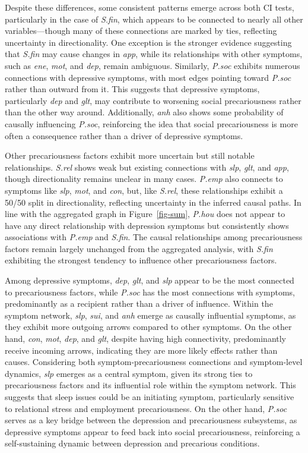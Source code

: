 \documentclass[
]{article}
\begin{document}
Despite these differences, some consistent patterns emerge across both
CI tests, particularly in the case of \emph{S.fin}, which appears to be
connected to nearly all other variables---though many of these
connections are marked by ties, reflecting uncertainty in
directionality. One exception is the stronger evidence suggesting that
\emph{S.fin} may cause changes in \emph{app}, while its relationships
with other symptoms, such as \emph{ene}, \emph{mot}, and \emph{dep},
remain ambiguous. Similarly, \emph{P.soc} exhibits numerous connections
with depressive symptoms, with most edges pointing toward \emph{P.soc}
rather than outward from it. This suggests that depressive symptoms,
particularly \emph{dep} and \emph{glt}, may contribute to worsening
social precariousness rather than the other way around. Additionally,
\emph{anh} also shows some probability of causally influencing
\emph{P.soc}, reinforcing the idea that social precariousness is more
often a consequence rather than a driver of depressive symptoms.

Other precariousness factors exhibit more uncertain but still notable
relationships. \emph{S.rel} shows weak but existing connections with
\emph{slp}, \emph{glt}, and \emph{app}, though directionality remains
unclear in many cases. \emph{P.emp} also connects to symptoms like
\emph{slp}, \emph{mot}, and \emph{con}, but, like \emph{S.rel}, these
relationships exhibit a 50/50 split in directionality, reflecting
uncertainty in the inferred causal paths. In line with the aggregated
graph in Figure~\ref{fig-sum}, \emph{P.hou} does not appear to have any
direct relationship with depression symptoms but consistently shows
associations with \emph{P.emp} and \emph{S.fin}. The causal
relationships among precariousness factors remain largely unchanged from
the aggregated analysis, with \emph{S.fin} exhibiting the strongest
tendency to influence other precariousness factors.

Among depressive symptoms, \emph{dep}, \emph{glt}, and \emph{slp} appear
to be the most connected to precariousness factors, while \emph{P.soc}
has the most connections with symptoms, predominantly as a recipient
rather than a driver of influence. Within the symptom network,
\emph{slp}, \emph{sui}, and \emph{anh} emerge as causally influential
symptoms, as they exhibit more outgoing arrows compared to other
symptoms. On the other hand, \emph{con}, \emph{mot}, \emph{dep}, and
\emph{glt}, despite having high connectivity, predominantly receive
incoming arrows, indicating they are more likely effects rather than
causes. Considering both symptom-precariousness connections and
symptom-level dynamics, \emph{slp} emerges as a central symptom, given
its strong ties to precariousness factors and its influential role
within the symptom network. This suggests that sleep issues could be an
initiating symptom, particularly sensitive to relational stress and
employment precariousness. On the other hand, \emph{P.soc} serves as a
key bridge between the depression and precariousness subsystems, as
depressive symptoms appear to feed back into social precariousness,
reinforcing a self-sustaining dynamic between depression and precarious
conditions.
\end{document}
